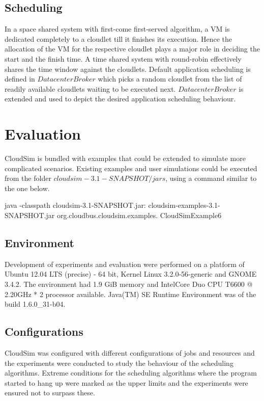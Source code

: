 \documentclass{llncs}
\begin{document}
\subsection{Scheduling}
In a space shared system with first-come first-served algorithm, a VM is dedicated completely to a cloudlet till it finishes its execution. Hence the allocation of the VM for the respective cloudlet plays a major role in deciding the start and the finish time. A time shared system with round-robin effectively shares the time window against the cloudlets. Default application scheduling is defined in $DatacenterBroker$ which picks a random cloudlet from the list of readily available cloudlets waiting to be executed next. $DatacenterBroker$ is extended and used to depict the desired application scheduling behaviour.

\section{Evaluation}
CloudSim is bundled with examples that could be extended to simulate more complicated scenarios. Existing examples and user simulations could be executed from the folder $cloudsim-3.1-SNAPSHOT/jars$, using a command similar to the one below.
\begin{verbatimtab}
java -classpath
    cloudsim-3.1-SNAPSHOT.jar:
    cloudsim-examples-3.1-SNAPSHOT.jar
    org.cloudbus.cloudsim.examples.
    CloudSimExample6
\end{verbatimtab}

\subsection{Environment}
Development of experiments and evaluation were performed on a platform of Ubuntu 12.04 LTS (precise) - 64 bit, Kernel Linux 3.2.0-56-generic and GNOME 3.4.2. The environment had 1.9 GiB memory and Intel\textregistered Core Duo CPU T6600 @ 2.20GHz * 2 processor available. Java(TM) SE Runtime Environment was of the build 1.6.0\_31-b04.
\subsection{Configurations}
CloudSim was configured with different configurations of jobs and resources and the experiments were conducted to study the behaviour of the scheduling algorithms. Extreme conditions for the scheduling algorithms where the program started to hang up were marked as the upper limits and the experiments were ensured not to surpass these.
\end{document}
